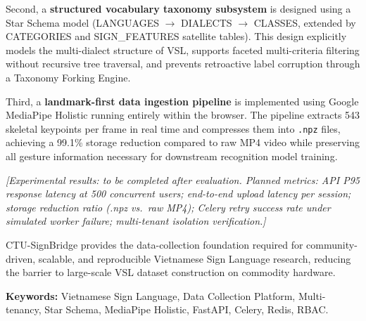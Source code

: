 Second, a \textbf{structured vocabulary taxonomy subsystem} is designed using a Star Schema model (LANGUAGES $\to$ DIALECTS $\to$ CLASSES, extended by CATEGORIES and SIGN\_FEATURES satellite tables). This design explicitly models the multi-dialect structure of VSL, supports faceted multi-criteria filtering without recursive tree traversal, and prevents retroactive label corruption through a Taxonomy Forking Engine.

Third, a \textbf{landmark-first data ingestion pipeline} is implemented using Google MediaPipe Holistic running entirely within the browser. The pipeline extracts 543 skeletal keypoints per frame in real time and compresses them into \texttt{.npz} files, achieving a 99.1\% storage reduction compared to raw MP4 video while preserving all gesture information necessary for downstream recognition model training.

\textit{[Experimental results: to be completed after evaluation.
Planned metrics: API P95 response latency at 500 concurrent users;
end-to-end upload latency per session;
storage reduction ratio (.npz vs.\ raw MP4);
Celery retry success rate under simulated worker failure;
multi-tenant isolation verification.]}

CTU-SignBridge provides the data-collection foundation required for community-driven, scalable, and reproducible Vietnamese Sign Language research, reducing the barrier to large-scale VSL dataset construction on commodity hardware.

\vspace{0.5cm}
\noindent\textbf{Keywords:} Vietnamese Sign Language, Data Collection Platform, Multi-tenancy, Star Schema, MediaPipe Holistic, FastAPI, Celery, Redis, RBAC.
